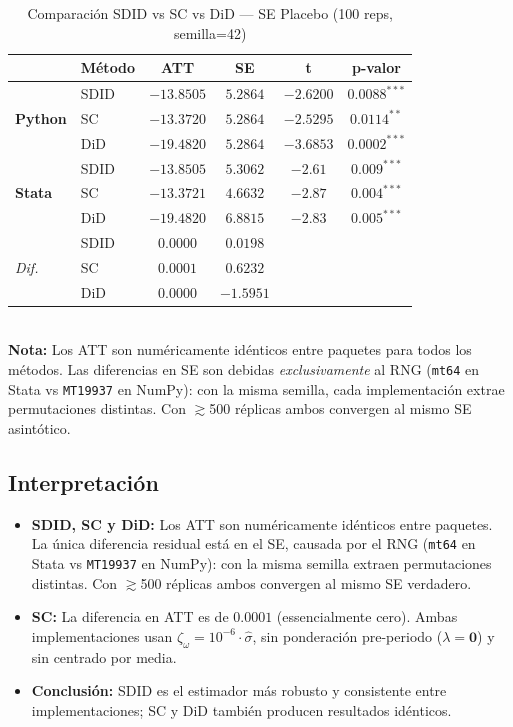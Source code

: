 \documentclass[11pt, a4paper]{article}
\newcommand{\py}{\textcolor{pyblue}{\textbf{Python}}}
\newcommand{\st}{\textcolor{stgreen}{\textbf{Stata}}}
\begin{document}
\begin{table}[H]
\centering
\caption{Comparación SDID vs SC vs DiD --- SE Placebo (100 reps, semilla=42)}
\setlength{\tabcolsep}{5pt}
\begin{tabular}{llcccc}
\toprule
& \textbf{Método} & \textbf{ATT} & \textbf{SE} & \textbf{t} & \textbf{p-valor} \\
\midrule
\multirow{3}{*}{\py{}}
  & SDID & $-13.8505$ & $5.2864$ & $-2.6200$ & $0.0088^{***}$ \\
  & SC   & $-13.3720$ & $5.2864$ & $-2.5295$ & $0.0114^{**}$ \\
  & DiD  & $-19.4820$ & $5.2864$ & $-3.6853$ & $0.0002^{***}$ \\
\midrule
\multirow{3}{*}{\st{}}
  & SDID & $-13.8505$ & $5.3062$ & $-2.61$ & $0.009^{***}$ \\
  & SC   & $-13.3721$ & $4.6632$ & $-2.87$ & $0.004^{***}$ \\
  & DiD  & $-19.4820$ & $6.8815$ & $-2.83$ & $0.005^{***}$ \\
\midrule
\multirow{3}{*}{\textit{Dif.}}
  & SDID & $0.0000$ & \cellcolor{matchrow}$\mathbf{0.0198}$ & & \\
  & SC   & \cellcolor{matchrow}$\mathbf{0.0001}$ & $0.6232$ & & \\
  & DiD  & $0.0000$ & $-1.5951$ & & \\
\bottomrule
\end{tabular}\\[0.4em]
{\small \textbf{Nota:} Los ATT son numéricamente idénticos entre paquetes para todos los métodos. Las diferencias en SE son debidas \textit{exclusivamente} al RNG (\texttt{mt64} en Stata vs \texttt{MT19937} en NumPy): con la misma semilla, cada implementación extrae permutaciones distintas. Con $\gtrsim$500 réplicas ambos convergen al mismo SE asintótico.}
\end{table}

\subsection*{Interpretación}

\begin{itemize}
  \item \textbf{SDID, SC y DiD:} Los ATT son numéricamente idénticos entre paquetes. La única diferencia residual está en el SE, causada por el RNG (\texttt{mt64} en Stata vs \texttt{MT19937} en NumPy): con la misma semilla extraen permutaciones distintas. Con $\gtrsim$500 réplicas ambos convergen al mismo SE verdadero.
  \item \textbf{SC:} La diferencia en ATT es de $0.0001$ (essencialmente cero). Ambas implementaciones usan $\zeta_\omega = 10^{-6} \cdot \hat\sigma$, sin ponderación pre-periodo ($\lambda = \mathbf{0}$) y sin centrado por media.
  \item \textbf{Conclusión:} SDID es el estimador más robusto y consistente entre implementaciones; SC y DiD también producen resultados idénticos.
\end{itemize}
\end{document}
